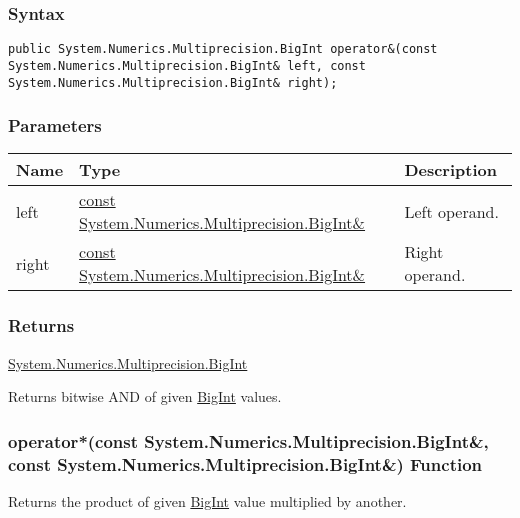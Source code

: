 \documentclass[a4paper,oneside,11.000000pt]{book}
\begin{document}
\subsubsection*{Syntax}
\texttt{public System.Numerics.Multiprecision.BigInt operator\&(const System.Numerics.Multiprecision.BigInt\& left, const System.Numerics.Multiprecision.BigInt\& right);}
\subsubsection*{Parameters}
\begin{flushleft}
\begin{supertabular}[l]{!{\raggedright}p{1.30721cm}!{\raggedright}p{8.55945cm}!{\raggedright}p{3.66839cm}}
\textbf{Name}
& \textbf{Type}
& \textbf{Description}
\\
\hline
left
& \hyperlink{System.Numerics.Multiprecision.BigInt}{const System.\-Numerics.\-Multiprecision.\-BigInt\&\-}
& Left operand.

\\
right
& \hyperlink{System.Numerics.Multiprecision.BigInt}{const System.\-Numerics.\-Multiprecision.\-BigInt\&\-}
& Right operand.

\\
\end{supertabular}

\end{flushleft}
\subsubsection*{Returns}
\hyperlink{System.Numerics.Multiprecision.BigInt}{System.\-Numerics.\-Multiprecision.\-BigInt}
\begin{flushleft}
Returns bitwise AND of given \hyperlink{System.Numerics.Multiprecision.BigInt}{BigInt} values.

\end{flushleft}
\clearpage

\hypertarget{System.Numerics.Multiprecision.operator.times.C.R.System.Numerics.Multiprecision.BigInt.C.R.System.Numerics.Multiprecision.BigInt}{\subsubsection*{operator*(const System.Numerics.Multiprecision.BigInt\&, const System.Numerics.Multiprecision.BigInt\&) Function}}
\begin{flushleft}
Returns the product of given \hyperlink{System.Numerics.Multiprecision.BigInt}{BigInt} value multiplied by another.

\end{flushleft}
\end{document}
